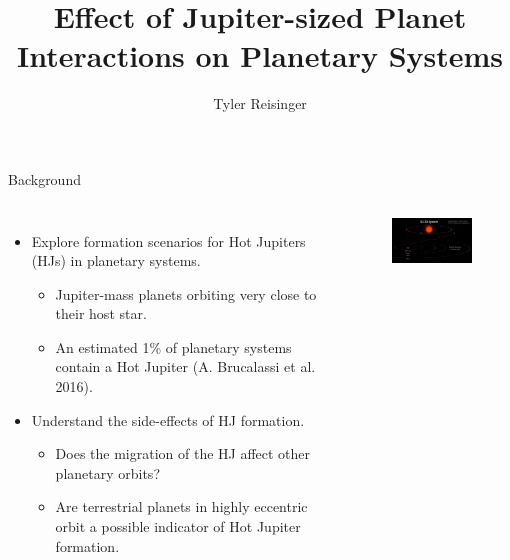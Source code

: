\documentclass{beamer}
\title{Effect of Jupiter-sized Planet Interactions on Planetary Systems}
\author{Tyler Reisinger}
\date{}
\begin{document}
\begin{frame}{Background}
    \begin{columns}
        \begin{itemize}
            \item Explore formation scenarios for Hot Jupiters (HJs) in planetary
                systems.
                \begin{itemize}
                    \item Jupiter-mass planets orbiting very close to their host star.
                    \item An estimated 1\% of planetary systems contain a 
                        Hot Jupiter (A. Brucalassi et al. 2016)\footnotemark.
                \end{itemize}
            \item Understand the side-effects of HJ formation.
                \begin{itemize}
                    \item Does the migration of the HJ affect other planetary orbits?
                    \item Are terrestrial planets in highly eccentric orbit a possible
                        indicator of Hot Jupiter formation.  
                \end{itemize}
        \end{itemize} 
            \begin{figure}
                \centering
                \includegraphics[width=1.66in]{hj_orbit}
            \end{figure}
    \end{columns}

\end{frame}
\end{document}

